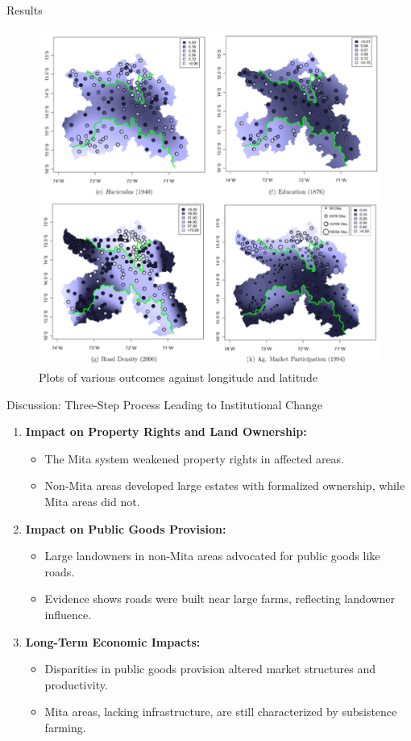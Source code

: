 \documentclass[notes,11pt, aspectratio=169]{beamer}
\begin{document}
\begin{frame}{Results}
    \begin{figure}
        \centering
        \includegraphics[width=0.45\linewidth]{Picture6.png}
        \caption{Plots of various outcomes against longitude and latitude}
        \label{fig:enter-label}
    \end{figure}
\end{frame}


\begin{frame}{Discussion: Three-Step Process Leading to Institutional Change}
    \begin{enumerate}
        \item \textbf{Impact on Property Rights and Land Ownership:}
            \begin{itemize}
                \item The Mita system weakened property rights in affected areas.
                \item Non-Mita areas developed large estates with formalized ownership, while Mita areas did not.
            \end{itemize}
        \item \textbf{Impact on Public Goods Provision:}
            \begin{itemize}
                \item Large landowners in non-Mita areas advocated for public goods like roads.
                \item Evidence shows roads were built near large farms, reflecting landowner influence.
            \end{itemize}
        \item \textbf{Long-Term Economic Impacts:}
            \begin{itemize}
                \item Disparities in public goods provision altered market structures and productivity.
                \item Mita areas, lacking infrastructure, are still characterized by subsistence farming.
            \end{itemize}
    \end{enumerate}
\end{frame}
\end{document}

